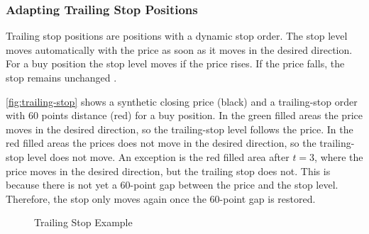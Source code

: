 \subsubsection{Adapting Trailing Stop Positions}

Trailing stop positions are positions with a dynamic stop order. The stop level moves automatically with the price as soon as it moves in the desired direction. For a buy position the stop level moves if the price rises. If the price falls, the stop remains unchanged \cite{ig-trailing}.

\autoref{fig:trailing-stop} shows a synthetic closing price (black) and a trailing-stop order with 60 points distance (red) for a buy position. In the green filled areas the price moves in the desired direction, so the trailing-stop level follows the price. In the red filled areas the prices does not move in the desired direction, so the trailing-stop level does not move. An exception is the red filled area after $t=3$, where the price moves in the desired direction, but the trailing stop does not. This is because there is not yet a 60-point gap between the price and the stop level. Therefore, the stop only moves again once the 60-point gap is restored.

\begin{figure}[H]
    \centering
    
    \caption{Trailing Stop Example}
    \label{fig:trailing-stop}
\end{figure}
